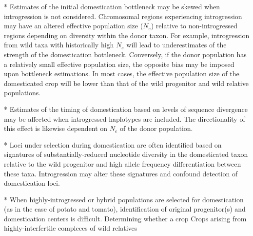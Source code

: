 \documentclass[11pt]{article}
\newcommand{\lwang}[1]{\textcolor{red}{ \emph{\scriptsize  #1}} } %
\newcommand{\gmj}[1]{\textcolor{blue}{ \emph{\scriptsize  #1}} } %
\begin{document}
* Estimates of the initial domestication bottleneck may be skewed when introgression is not considered.
Chromosomal regions experiencing introgression may have an altered effective population size ($N_e$) relative to non-introgressed regions depending on diversity within the donor taxon.
For example, introgression from wild taxa with historically high $N_e$ will lead to underestimates of the strength of the domestication bottleneck.
Conversely, if the donor population has a relatively small effective population size, the opposite bias may be imposed upon bottleneck estimations.
In most cases, the effective population size of the domesticated crop will be lower than that of the wild progenitor and wild relative populations.

* Estimates of the timing of domestication based on levels of sequence divergence may be affected when introgressed haplotypes are included.
The directionality of this effect is likewise dependent on $N_e$ of the donor population.


* Loci under selection during domestication are often identified based on signatures of substantially-reduced nucleotide diversity in the domesticated taxon relative to the wild progenitor and high allele frequency differentiation between these taxa.
Introgression may alter these signatures and confound detection of domestication loci.



* When  highly-introgressed or hybrid populations are selected for domestication (as in the case of potato and tomato), identification of original progenitor(s) and domestication centers is difficult.
Determining whether a crop 
Crops arising from highly-interfertile compleces of wild relatives 

\end{document}
